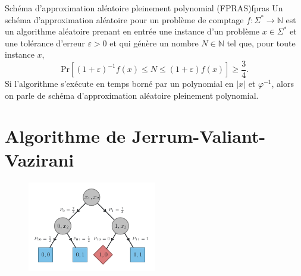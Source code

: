 \begin{maindefinition}{Schéma d'approximation aléatoire pleinement polynomial (FPRAS)}{fpras}
    Un schéma d'approximation aléatoire pour un problème de comptage $f: \Sigma^{*} \to \mathbb{N}$ est un algorithme aléatoire prenant en entrée une instance d'un problème $x \in \Sigma^{*}$ et une tolérance d'erreur $\varepsilon > 0$ et qui génère un nombre $N \in \mathbb{N}$ tel que, pour toute instance $x$,
    \begin{equation*}
        \mathrm{ Pr }\left[(1+\varepsilon)^{-1} f(x) \leq N \leq (1+\varepsilon)f(x)\right] \geq \frac{3}{4} .
    \end{equation*}
    Si l'algorithme s'exécute en temps borné par un polynomial en $\lvert x \rvert$ et $\varphi^{-1}$, alors on parle de schéma d'approximation aléatoire pleinement polynomial.
\end{maindefinition}


\section{Algorithme de Jerrum-Valiant-Vazirani}
\label{sec:algorithme-jvv}

\begin{figure}[h]
    \centering
    \includegraphics[width=0.5\textwidth]{figures/jvv-algorithm.pdf}
    \caption{}
    \label{fig:jvv-algorithm}
\end{figure}